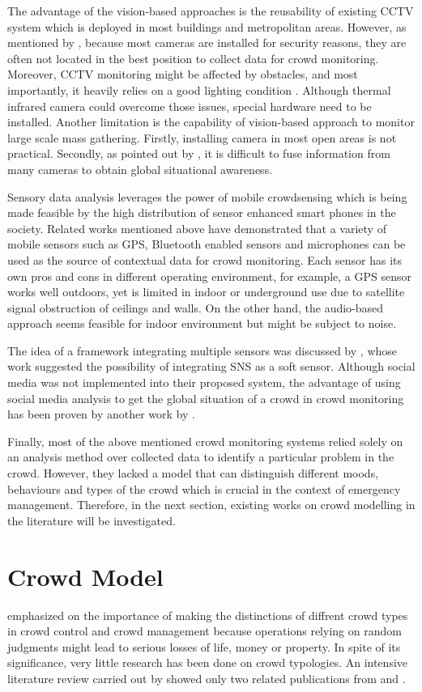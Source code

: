 The advantage of the vision-based approaches is the reusability of existing CCTV system which is deployed in most buildings and metropolitan areas. However, as mentioned by \citet{Davies1995}, because most cameras are installed for security reasons, they are often not located in the best position to collect data for crowd monitoring. Moreover, CCTV monitoring might be affected by obstacles, and most importantly, it heavily relies on a good lighting condition \citep{Wirz2012}. Although thermal infrared camera could overcome those issues, special hardware need to be installed. Another limitation is the capability of vision-based approach to monitor large scale mass gathering. Firstly, installing camera in most open areas is not practical. Secondly, as pointed out by \citet{Wirz2012}, it is difficult to fuse information from many cameras to obtain global situational awareness.

Sensory data analysis leverages the power of mobile crowdsensing which is being made feasible by the high distribution of sensor enhanced smart phones in the society. Related works mentioned above have demonstrated that a variety of mobile sensors such as GPS, Bluetooth enabled sensors and microphones can be used as the source of contextual data for crowd monitoring. Each sensor has its own pros and cons in different operating environment, for example, a GPS sensor works well outdoors, yet is limited in indoor or underground use due to satellite signal obstruction of ceilings and walls. On the other hand, the audio-based approach seems feasible for indoor environment but might be subject to noise.

The idea of a framework integrating multiple sensors was discussed by \citet{Ramesh2014}, whose work suggested the possibility of integrating SNS as a soft sensor. Although social media was not implemented into their proposed system, the advantage of using social media analysis to get the global situation of a crowd in crowd monitoring has been proven by another work by \citet{DelirHaghighi2013}.

Finally, most of the above mentioned crowd monitoring systems relied solely on an analysis method over collected data to identify a particular problem in the crowd. However, they lacked a model that can distinguish different moods, behaviours and types of the crowd which is crucial in the context of emergency management. Therefore, in the next section, existing works on crowd modelling in the literature will be investigated.

\section{Crowd Model}
\citet{Berlonghi1995} emphasized on the importance of making the distinctions of diffrent crowd types in crowd control and crowd management because operations relying on random judgments might lead to serious losses of life, money or property. In spite of its significance, very little research has been done on crowd typologies. An intensive literature review carried out by \citet{Challenger2009} showed only two related publications from \citet{Momboisse1967} and \citet{Berlonghi1995}.

